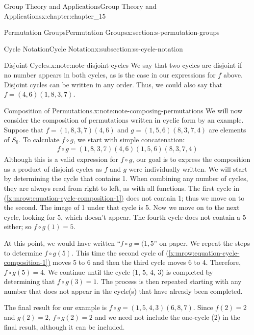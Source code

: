 \documentclass[twoside,10pt,]{book}
\newcommand{\xreffont}{\relax}
\numberwithin{equation}{section}
\begin{document}
\begin{chapterptx}{Group Theory and Applications}{}{Group Theory and Applications}{}{}{x:chapter:chapter_15}
\begin{sectionptx}{Permutation Groups}{}{Permutation Groups}{}{}{x:section:s-permutation-groups}
\begin{subsectionptx}{Cycle Notation}{}{Cycle Notation}{}{}{x:subsection:ss-cycle-notation}
\begin{note}{Disjoint Cycles.}{x:note:note-disjoint-cycles}%
%
We say that two cycles are disjoint if no number appears in both cycles, as is the case in our expressions for \(f\) above. Disjoint cycles can be written in any order. Thus, we could also say that \(f=(4,6)(1,8,3,7)\).%
\end{note}
\begin{note}{Composition of Permutations.}{x:note:note-composing-permutations}%
%
We will now consider the composition of permutations written in cyclic form by an example. Suppose that \(f
= (1,8, 3, 7)(4, 6)\) and \(g = (1, 5, 6)(8, 3, 7, 4)\) are elements of \(S_8\). To calculate \(f\circ g\), we start with simple concatenation:%
\begin{gather}
f \circ g = (1,8, 3, 7)(4, 6)(1,5,6)(8, 3, 7,4)\label{x:mrow:equation-cycle-composition-1}
\end{gather}
Although this is a valid expression for \(f \circ g\), our goal is to express the composition as a product of disjoint cycles as \(f\) and \(g\) were individually written. We will start by determining the cycle that contains 1.  When combining any number of cycles, they are always read from right to left, as with all functions. The first cycle  in \hyperref[x:mrow:equation-cycle-composition-1]{({\xreffont\ref{x:mrow:equation-cycle-composition-1}})} does not contain 1; thus we move on to the second. The image of 1 under that cycle is 5. Now we move on to the next cycle, looking for 5, which doesn't appear. The fourth cycle does not contain a 5 either; so \(f\circ g(1) = 5\).%
\par
At this point, we would have written ``\(f \circ g = (1,5 \)'' on paper. We repeat the steps to determine \(f\circ g(5)\). This time the second cycle of \hyperref[x:mrow:equation-cycle-composition-1]{({\xreffont\ref{x:mrow:equation-cycle-composition-1}})} moves 5 to 6 and then the third cycle moves 6 to 4. Therefore, \(f\circ g(5) = 4\). We continue until the cycle (1, 5, 4, 3) is completed by determining that \(f\circ g(3) = 1\). The process is  then repeated starting with any number that does not appear in the cycle(s) that have already been completed.%
\par
The final result for our example is \(f \circ g = (1, 5, 4, 3)(6, 8, 7)\). Since \(f(2) = 2\) and \(g(2) = 2\), \(f\circ g(2) = 2\) and we need not include the one-cycle (2) in the final result, although it can be included.%
\end{note}

\end{subsectionptx}
\end{sectionptx}
\end{chapterptx}
\end{document}
